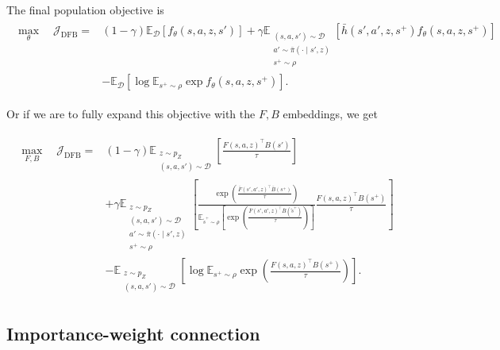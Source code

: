 \documentclass[11pt]{article}
\begin{document}
The final population objective is
\begin{align}
\label{eq:dfb-final}
\boxed{
\begin{aligned}
    \max_\theta\quad \mathcal J_{\mathrm{DFB}} ={}& (1-\gamma) \mathbb E_{\mathcal D} \left[ f_\theta(s,a,z,s') \right] 
                                                + \gamma \mathbb E_{\substack{(s,a,s')\sim\mathcal D\\a'\sim\bar\pi(\cdot\mid s',z)\\ s^+\sim\rho}} \left[ \bar h(s',a',z,s^+)f_\theta(s,a,z,s^+)\right] \\
                                                &- \mathbb E_{\mathcal D} \left[\log\mathbb E_{s^+\sim\rho}\exp f_\theta(s,a,z,s^+)\right].
\end{aligned}
}
\end{align}

Or if we are to fully expand this objective with the $F,B$ embeddings, we get

\begin{align}
\boxed{
\begin{aligned}
    \max_{F,B}\quad \mathcal J_{\mathrm{DFB}} ={}& (1-\gamma) \mathbb E_{\substack{ z\sim p_Z\\ (s,a,s')\sim\mathcal D }} \left[                                                               \frac{F(s,a,z)^\top B(s')}{\tau} \right] \\
                                                &+ \gamma \mathbb E_{\substack{z\sim p_Z\\(s,a,s')\sim\mathcal D\\a'\sim\bar\pi(\cdot\mid s',z)\\s^+\sim\rho}} \left[ \frac{\exp\left(\frac{\bar F(s',a',z)^\top\bar B(s^+)}{\tau}\right)}{\mathbb E_{\tilde s^+\sim\rho}\left[\exp\left(\frac{\bar F(s',a',z)^\top\bar B(\tilde s^+)}{\tau}\right) \right]} \frac{F(s,a,z)^\top B(s^+)}{\tau}\right] \\
                                                &- \mathbb E_{\substack{z\sim p_Z\\(s,a,s')\sim\mathcal D}}\left[\log\mathbb E_{s^+\sim\rho}\exp\left(\frac{F(s,a,z)^\top B(s^+)}{\tau}\right)\right].
\end{aligned}
}
\label{eq:dfb-final-expanded}
\end{align}

\subsection{Importance-weight connection}
\end{document}
